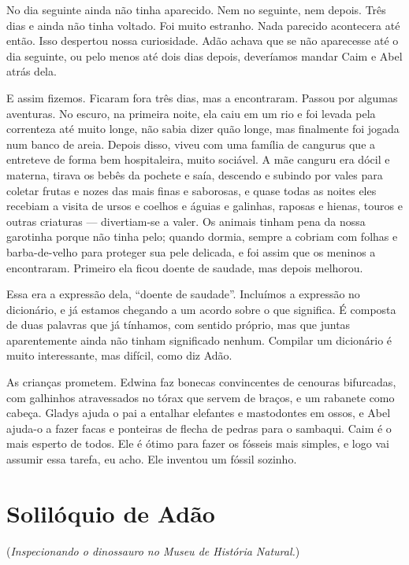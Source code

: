 No dia seguinte ainda não tinha aparecido. Nem no seguinte, nem depois.
Três dias e ainda não tinha voltado. Foi muito estranho. Nada parecido
acontecera até então. Isso despertou nossa curiosidade. Adão achava
que se não aparecesse até o dia seguinte, ou pelo menos até dois dias depois,     
deveríamos mandar Caim e Abel atrás dela.

E assim fizemos. Ficaram fora três dias, mas a encontraram. Passou por algumas
aventuras. No escuro, na primeira noite, ela caiu em um rio e foi levada pela
correnteza até muito longe, não sabia dizer quão longe, mas finalmente foi
jogada num banco de areia. Depois disso, viveu com uma família de cangurus
que a entreteve de forma bem hospitaleira, muito sociável. A mãe canguru
era dócil e materna, tirava os bebês da pochete e saía, descendo e subindo
por vales para coletar frutas e nozes das mais finas e saborosas, e quase todas
as noites eles recebiam a visita de ursos e coelhos e águias e galinhas, raposas e
hienas, touros e outras criaturas --- divertiam-se a valer. Os animais tinham
pena da nossa garotinha porque não tinha pelo; quando dormia, sempre a cobriam
com folhas e barba-de-velho para proteger sua pele delicada, e foi assim que os
meninos a encontraram. Primeiro ela ficou doente de saudade, mas depois
melhorou.

Essa era a expressão dela, “doente de saudade”. Incluímos a expressão no dicionário, e
já estamos chegando a um acordo sobre o que significa. É composta de duas palavras
que já tínhamos, com sentido próprio, mas que juntas aparentemente ainda não
tinham significado nenhum. Compilar um dicionário é muito interessante,
mas difícil, como diz Adão.

 As crianças prometem. Edwina faz bonecas convincentes de cenouras
bifurcadas, com galhinhos atravessados no tórax que servem de braços, e um
rabanete como cabeça. Gladys ajuda o pai a entalhar elefantes e mastodontes em
ossos, e Abel ajuda-o a fazer facas e ponteiras de flecha de pedras para o 
sambaqui. Caim é o mais esperto de todos. Ele é ótimo para fazer os 
fósseis mais simples, e logo vai assumir essa tarefa, eu acho. Ele inventou um 
fóssil sozinho.

\chapter{Solilóquio de Adão}
\medskip

\noindent (\textit{Inspecionando o dinossauro no Museu de História Natural.})

